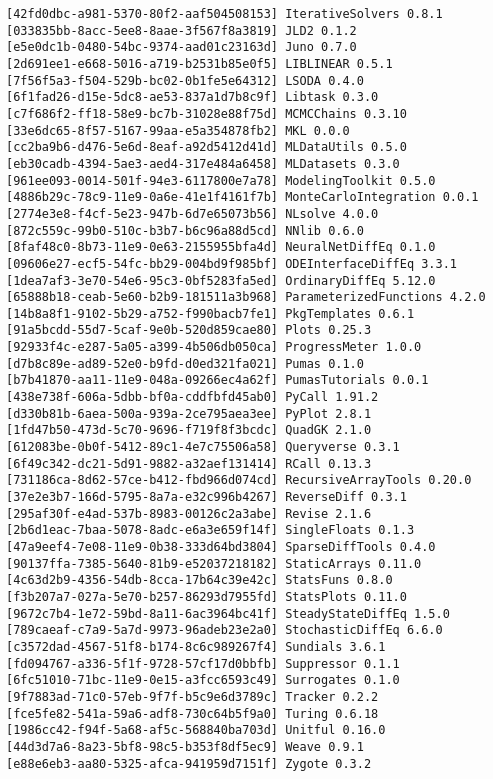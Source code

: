 \documentclass[12pt,a4paper]{article}
\begin{document}
\begin{verbatim}
[42fd0dbc-a981-5370-80f2-aaf504508153] IterativeSolvers 0.8.1
[033835bb-8acc-5ee8-8aae-3f567f8a3819] JLD2 0.1.2
[e5e0dc1b-0480-54bc-9374-aad01c23163d] Juno 0.7.0
[2d691ee1-e668-5016-a719-b2531b85e0f5] LIBLINEAR 0.5.1
[7f56f5a3-f504-529b-bc02-0b1fe5e64312] LSODA 0.4.0
[6f1fad26-d15e-5dc8-ae53-837a1d7b8c9f] Libtask 0.3.0
[c7f686f2-ff18-58e9-bc7b-31028e88f75d] MCMCChains 0.3.10
[33e6dc65-8f57-5167-99aa-e5a354878fb2] MKL 0.0.0
[cc2ba9b6-d476-5e6d-8eaf-a92d5412d41d] MLDataUtils 0.5.0
[eb30cadb-4394-5ae3-aed4-317e484a6458] MLDatasets 0.3.0
[961ee093-0014-501f-94e3-6117800e7a78] ModelingToolkit 0.5.0
[4886b29c-78c9-11e9-0a6e-41e1f4161f7b] MonteCarloIntegration 0.0.1
[2774e3e8-f4cf-5e23-947b-6d7e65073b56] NLsolve 4.0.0
[872c559c-99b0-510c-b3b7-b6c96a88d5cd] NNlib 0.6.0
[8faf48c0-8b73-11e9-0e63-2155955bfa4d] NeuralNetDiffEq 0.1.0
[09606e27-ecf5-54fc-bb29-004bd9f985bf] ODEInterfaceDiffEq 3.3.1
[1dea7af3-3e70-54e6-95c3-0bf5283fa5ed] OrdinaryDiffEq 5.12.0
[65888b18-ceab-5e60-b2b9-181511a3b968] ParameterizedFunctions 4.2.0
[14b8a8f1-9102-5b29-a752-f990bacb7fe1] PkgTemplates 0.6.1
[91a5bcdd-55d7-5caf-9e0b-520d859cae80] Plots 0.25.3
[92933f4c-e287-5a05-a399-4b506db050ca] ProgressMeter 1.0.0
[d7b8c89e-ad89-52e0-b9fd-d0ed321fa021] Pumas 0.1.0
[b7b41870-aa11-11e9-048a-09266ec4a62f] PumasTutorials 0.0.1
[438e738f-606a-5dbb-bf0a-cddfbfd45ab0] PyCall 1.91.2
[d330b81b-6aea-500a-939a-2ce795aea3ee] PyPlot 2.8.1
[1fd47b50-473d-5c70-9696-f719f8f3bcdc] QuadGK 2.1.0
[612083be-0b0f-5412-89c1-4e7c75506a58] Queryverse 0.3.1
[6f49c342-dc21-5d91-9882-a32aef131414] RCall 0.13.3
[731186ca-8d62-57ce-b412-fbd966d074cd] RecursiveArrayTools 0.20.0
[37e2e3b7-166d-5795-8a7a-e32c996b4267] ReverseDiff 0.3.1
[295af30f-e4ad-537b-8983-00126c2a3abe] Revise 2.1.6
[2b6d1eac-7baa-5078-8adc-e6a3e659f14f] SingleFloats 0.1.3
[47a9eef4-7e08-11e9-0b38-333d64bd3804] SparseDiffTools 0.4.0
[90137ffa-7385-5640-81b9-e52037218182] StaticArrays 0.11.0
[4c63d2b9-4356-54db-8cca-17b64c39e42c] StatsFuns 0.8.0
[f3b207a7-027a-5e70-b257-86293d7955fd] StatsPlots 0.11.0
[9672c7b4-1e72-59bd-8a11-6ac3964bc41f] SteadyStateDiffEq 1.5.0
[789caeaf-c7a9-5a7d-9973-96adeb23e2a0] StochasticDiffEq 6.6.0
[c3572dad-4567-51f8-b174-8c6c989267f4] Sundials 3.6.1
[fd094767-a336-5f1f-9728-57cf17d0bbfb] Suppressor 0.1.1
[6fc51010-71bc-11e9-0e15-a3fcc6593c49] Surrogates 0.1.0
[9f7883ad-71c0-57eb-9f7f-b5c9e6d3789c] Tracker 0.2.2
[fce5fe82-541a-59a6-adf8-730c64b5f9a0] Turing 0.6.18
[1986cc42-f94f-5a68-af5c-568840ba703d] Unitful 0.16.0
[44d3d7a6-8a23-5bf8-98c5-b353f8df5ec9] Weave 0.9.1
[e88e6eb3-aa80-5325-afca-941959d7151f] Zygote 0.3.2
\end{verbatim}
\end{document}
